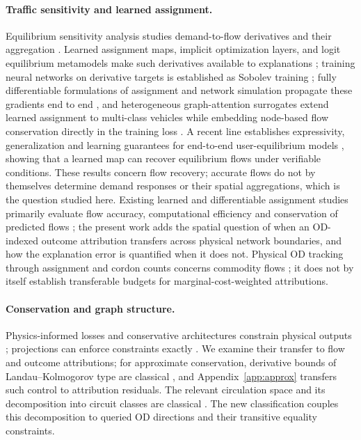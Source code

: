 \documentclass[a4paper,fleqn]{cas-sc}
\begin{document}
\paragraph{Traffic sensitivity and learned assignment.}
Equilibrium sensitivity analysis studies demand-to-flow derivatives and
their aggregation
\citep{tobin1988sensitivity,yang2005sensitivity,josefsson2007sensitivity,patriksson2003aggregated}.
Learned assignment maps, implicit optimization layers, and logit
equilibrium metamodels make such derivatives available to explanations
\citep{liu2023endtoend,amos2017optnet,lassen2025learning}; training
neural networks on derivative targets is established as Sobolev
training \citep{czarnecki2017sobolev,yuan2022sobolev}; fully
differentiable formulations of assignment and network simulation
propagate these gradients end to end
\citep{li2026differentiable,seo2026differentiable}, and heterogeneous
graph-attention surrogates extend learned assignment to multi-class
vehicles while embedding node-based flow conservation directly in the
training loss \citep{liu2024heterogeneous,liu2025multiclass}. A recent
line establishes expressivity, generalization and learning guarantees
for end-to-end user-equilibrium models \citep{liu2025endtoend},
showing that a learned map can recover equilibrium flows under
verifiable conditions. These results concern flow recovery; accurate
flows do not by themselves determine demand responses or their spatial
aggregations, which is the question studied here. Existing learned and
differentiable assignment studies primarily evaluate flow accuracy,
computational efficiency and conservation of predicted flows
\citep{liu2023endtoend,liu2024heterogeneous,liu2025multiclass,li2026differentiable};
the present work adds the spatial question of when an OD-indexed
outcome attribution transfers across physical network boundaries, and
how the explanation error is quantified when it does not.
Physical OD tracking through assignment and cordon counts concerns
commodity flows \citep{sheffi1985urban,vanzuylen1980most,bar2002origin};
it does not by itself establish transferable budgets for
marginal-cost-weighted attributions.

\paragraph{Conservation and graph structure.}
Physics-informed losses and conservative architectures constrain physical
outputs \citep{raissi2019physics,shi2021physics,richterpowell2022neural};
projections can enforce constraints exactly \citep{valente2025physics,baez2024guaranteeing}.
We examine their transfer to flow and outcome attributions; for
approximate conservation, derivative bounds of Landau--Kolmogorov type
are classical \citep{shadrin2014landau}, and
Appendix~\ref{app:approx} transfers such control to attribution
residuals. The relevant
circulation space and its decomposition into circuit classes are classical
\citep{oxley2011matroid,hopcroft1973algorithm}. The new classification couples
this decomposition to queried OD directions and their transitive equality
constraints.
\end{document}
